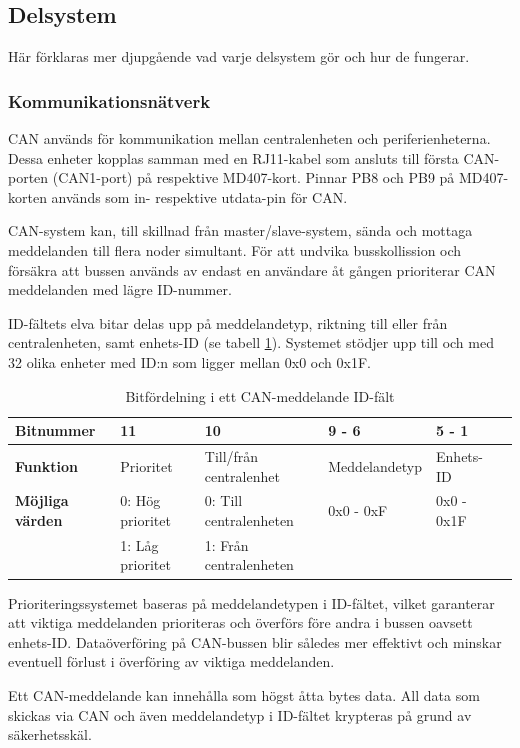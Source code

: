 \subsection{Delsystem}
Här förklaras mer djupgående vad varje delsystem gör och hur de fungerar.
\subsubsection{Kommunikationsnätverk}

CAN används för kommunikation mellan centralenheten och periferienheterna. Dessa enheter kopplas samman med en RJ11-kabel som ansluts till första CAN-porten (CAN1-port) på respektive MD407-kort. Pinnar PB8 och PB9 på MD407-korten används som in- respektive utdata-pin för CAN.

CAN-system kan, till skillnad från master/slave-system, sända och mottaga meddelanden till flera noder simultant. För att undvika busskollission och försäkra att bussen används av endast en användare åt gången prioriterar CAN meddelanden med lägre ID-nummer. 

ID-fältets elva bitar delas upp på meddelandetyp, riktning till eller från centralenheten, samt enhets-ID (se tabell \ref{systemöversikt_can:1}). Systemet stödjer upp till och med 32 olika enheter med ID:n som ligger mellan 0x0 och 0x1F.


\begin{table}[h!]
\caption{Bitfördelning i ett CAN-meddelande ID-fält}
\label{systemöversikt_can:1}
\centering
\begin{tabular}{|l|l|l|l|l|l| }
\hline
\textbf{Bitnummer} & 11 & 10 & 9 - 6 & 5 - 1 \\
\hline
\textbf{Funktion} & Prioritet & Till/från centralenhet & Meddelandetyp & Enhets-ID \\
\hline
\textbf{Möjliga värden} & 0: Hög prioritet & 0: Till centralenheten & 0x0 - 0xF & 0x0 - 0x1F \\
\textbf{} & 1: Låg prioritet & 1: Från centralenheten & & \\
\hline
\end{tabular}
\end{table}

Prioriteringssystemet baseras på meddelandetypen i ID-fältet, vilket garanterar att viktiga meddelanden prioriteras och överförs före andra i bussen oavsett enhets-ID. Dataöverföring på CAN-bussen blir således mer effektivt och minskar eventuell förlust i överföring av viktiga meddelanden.

Ett CAN-meddelande kan innehålla som högst åtta bytes data. All data som skickas via CAN och även meddelandetyp i ID-fältet krypteras på grund av säkerhetsskäl.


